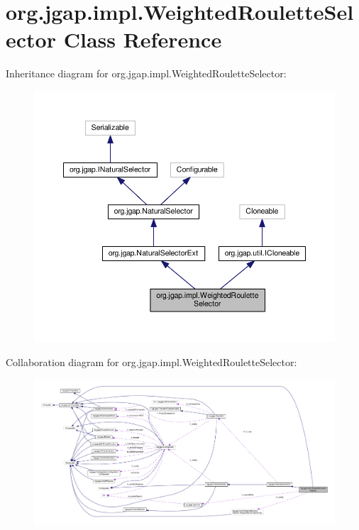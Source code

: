 \hypertarget{classorg_1_1jgap_1_1impl_1_1_weighted_roulette_selector}{\section{org.\-jgap.\-impl.\-Weighted\-Roulette\-Selector Class Reference}
\label{classorg_1_1jgap_1_1impl_1_1_weighted_roulette_selector}
}


Inheritance diagram for org.\-jgap.\-impl.\-Weighted\-Roulette\-Selector\-:
\nopagebreak
\begin{figure}[H]
\begin{center}
\leavevmode
\includegraphics[width=350pt]{classorg_1_1jgap_1_1impl_1_1_weighted_roulette_selector__inherit__graph}
\end{center}
\end{figure}


Collaboration diagram for org.\-jgap.\-impl.\-Weighted\-Roulette\-Selector\-:
\nopagebreak
\begin{figure}[H]
\begin{center}
\leavevmode
\includegraphics[width=350pt]{classorg_1_1jgap_1_1impl_1_1_weighted_roulette_selector__coll__graph}
\end{center}
\end{figure}
